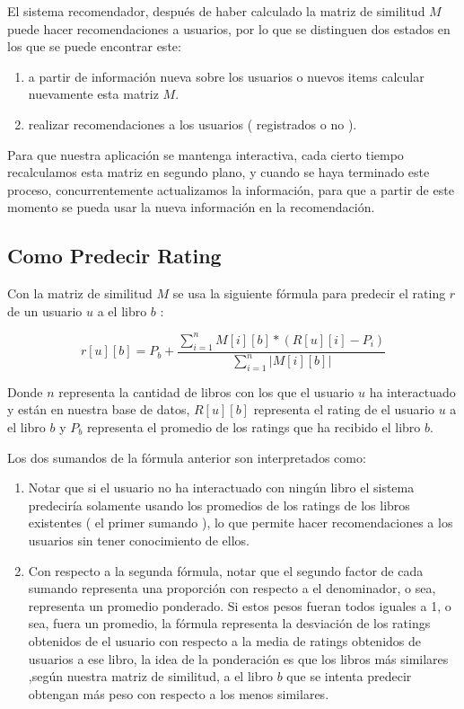 \documentclass[14pt]{extarticle}
\begin{document}
El sistema recomendador, después de haber calculado la matriz de similitud $M$ puede hacer recomendaciones a usuarios, por lo que se distinguen dos estados en los que se puede encontrar este:

\begin{enumerate}
    \item a partir de información nueva sobre los usuarios o nuevos items calcular nuevamente esta matriz $M$.
    \item realizar recomendaciones a los usuarios ( registrados o no ).
\end{enumerate}

Para que nuestra aplicación se mantenga interactiva, cada cierto tiempo recalculamos esta matriz en segundo plano, y cuando se haya terminado este proceso, concurrentemente actualizamos la información, para que a partir de este momento se pueda usar la nueva información en la recomendación.


\subsection{Como Predecir Rating}  

Con la matriz de similitud $M$ se usa la siguiente fórmula para predecir el rating $r$ de un usuario $u$ a el libro $b$ :

$$r[u][b] = P_b + \frac{\sum_{i = 1}^n M[i][b]*(R[u][i] - P_i)}{\sum_{i = 1}^n | M[i][b] | }$$

Donde $n$ representa la cantidad de libros con los que el usuario $u$ ha interactuado y están en nuestra base de datos, $R[u][b]$ representa el rating de el usuario $u$ a el libro $b$ y $P_b$ representa el promedio de los ratings que ha recibido el libro $b$.

Los dos sumandos de la fórmula anterior son interpretados como:

\begin{enumerate}
    \item Notar que si el usuario no ha interactuado con ningún libro el sistema predeciría solamente usando los promedios de los ratings de los libros existentes ( el primer sumando ), lo que permite hacer recomendaciones a los usuarios sin tener conocimiento de ellos.
    \item Con respecto a la segunda fórmula, notar que el segundo factor de cada sumando representa una proporción con respecto a el denominador, o sea, representa un promedio ponderado. Si estos pesos fueran todos iguales a 1, o sea, fuera un promedio, la fórmula representa la desviación de los ratings obtenidos de el usuario con respecto a la media de ratings obtenidos de usuarios a ese libro, la idea de la ponderación es que los libros más similares ,según nuestra matriz de similitud, a el libro $b$ que se intenta predecir obtengan más peso con respecto a los menos similares. 
\end{enumerate}
\end{document}
